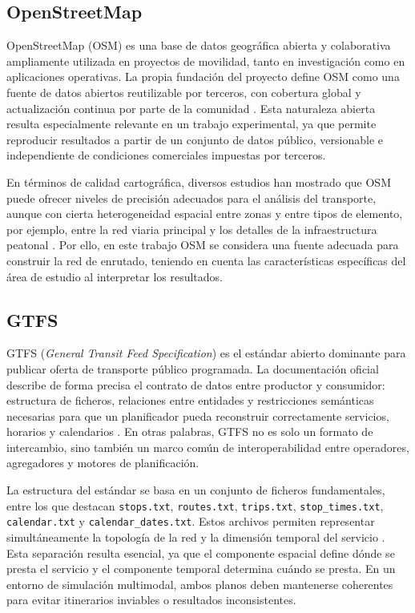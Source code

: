 \subsection{OpenStreetMap}

OpenStreetMap (OSM) es una base de datos geográfica abierta y colaborativa ampliamente utilizada en proyectos de movilidad, tanto en investigación como en aplicaciones operativas. La propia fundación del proyecto define OSM como una fuente de datos abiertos reutilizable por terceros, con cobertura global y actualización continua por parte de la comunidad \cite{OSMAbout}. Esta naturaleza abierta resulta especialmente relevante en un trabajo experimental, ya que permite reproducir resultados a partir de un conjunto de datos público, versionable e independiente de condiciones comerciales impuestas por terceros.

En términos de calidad cartográfica, diversos estudios han mostrado que OSM puede ofrecer niveles de precisión adecuados para el análisis del transporte, aunque con cierta heterogeneidad espacial entre zonas y entre tipos de elemento, por ejemplo, entre la red viaria principal y los detalles de la infraestructura peatonal \cite{Haklay2010}. Por ello, en este trabajo OSM se considera una fuente adecuada para construir la red de enrutado, teniendo en cuenta las características específicas del área de estudio al interpretar los resultados.

\subsection{GTFS}

GTFS (\textit{General Transit Feed Specification}) es el estándar abierto dominante para publicar oferta de transporte público programada. La documentación oficial describe de forma precisa el contrato de datos entre productor y consumidor: estructura de ficheros, relaciones entre entidades y restricciones semánticas necesarias para que un planificador pueda reconstruir correctamente servicios, horarios y calendarios \cite{GTFSReference}. En otras palabras, GTFS no es solo un formato de intercambio, sino también un marco común de interoperabilidad entre operadores, agregadores y motores de planificación.

La estructura del estándar se basa en un conjunto de ficheros fundamentales, entre los que destacan \texttt{stops.txt}, \texttt{routes.txt}, \texttt{trips.txt}, \texttt{stop\_times.txt}, \texttt{calendar.txt} y \texttt{calendar\_dates.txt}. Estos archivos permiten representar simultáneamente la topología de la red y la dimensión temporal del servicio \cite{GTFSReference}. Esta separación resulta esencial, ya que el componente espacial define dónde se presta el servicio y el componente temporal determina cuándo se presta. En un entorno de simulación multimodal, ambos planos deben mantenerse coherentes para evitar itinerarios inviables o resultados inconsistentes.

